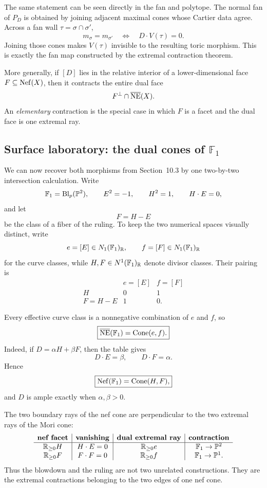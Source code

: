 The same statement can be seen directly in the fan and polytope.  The
normal fan of \(P_D\) is obtained by joining adjacent maximal cones
whose Cartier data agree.  Across a fan wall
\(\tau=\sigma\cap\sigma'\),
\[
m_\sigma=m_{\sigma'}
\quad\Longleftrightarrow\quad
D\cdot V(\tau)=0.
\]
Joining those cones makes \(V(\tau)\) invisible to the resulting
toric morphism.  This is exactly the fan map constructed by the
extremal contraction theorem.

More generally, if \([D]\) lies in the relative interior of a
lower-dimensional face \(F\subseteq\operatorname{Nef}(X)\), then it contracts the
entire dual face
\[
F^\perp\cap\overline{\operatorname{NE}}(X).
\]
An \emph{elementary} contraction is the special case in which \(F\)
is a facet and the dual face is one extremal ray.

\subsection{Surface laboratory: the dual cones of
\texorpdfstring{\(\mathbb F_1\)}{F1}}

We can now recover both morphisms from Section~10.3 by one two-by-two
intersection calculation.  Write
\[
\mathbb F_1=\operatorname{Bl}_p(\mathbb{P}^2),
\qquad
E^2=-1,
\qquad
H^2=1,
\qquad
H\cdot E=0,
\]
and let
\[
F=H-E
\]
be the class of a fiber of the ruling.  To keep the two numerical
spaces visually distinct, write
\[
e=[E]\in N_1(\mathbb F_1)_{\mathbb{R}},
\qquad
f=[F]\in N_1(\mathbb F_1)_{\mathbb{R}}
\]
for the curve classes, while \(H,F\in N^1(\mathbb F_1)_{\mathbb{R}}\) denote
divisor classes.  Their pairing is
\[
\begin{array}{c|cc}
&e=[E]&f=[F]
\\
\hline
H&0&1
\\
F=H-E&1&0.
\end{array}
\]

Every effective curve class is a nonnegative combination of \(e\) and
\(f\), so
\[
\boxed{
\overline{\operatorname{NE}}(\mathbb F_1)
=
\operatorname{Cone}(e,f).}
\]
Indeed, if \(D=\alpha H+\beta F\), then the table gives
\[
D\cdot E=\beta,
\qquad
D\cdot F=\alpha.
\]
Hence
\[
\boxed{
\operatorname{Nef}(\mathbb F_1)
=
\operatorname{Cone}(H,F),}
\]
and \(D\) is ample exactly when \(\alpha,\beta>0\).

The two boundary rays of the nef cone are perpendicular to the two
extremal rays of the Mori cone:
\[
\begin{array}{c|c|c|c}
\textbf{nef facet}
&\textbf{vanishing}
&\textbf{dual extremal ray}
&\textbf{contraction}
\\
\hline
\mathbb{R}_{\geq0}H
&H\cdot E=0
&\mathbb{R}_{\geq0}e
&\mathbb F_1\to\mathbb{P}^2
\\
\mathbb{R}_{\geq0}F
&F\cdot F=0
&\mathbb{R}_{\geq0}f
&\mathbb F_1\to\mathbb{P}^1.
\end{array}
\]
Thus the blowdown and the ruling are not two unrelated constructions.
They are the extremal contractions belonging to the two edges of one
nef cone.

